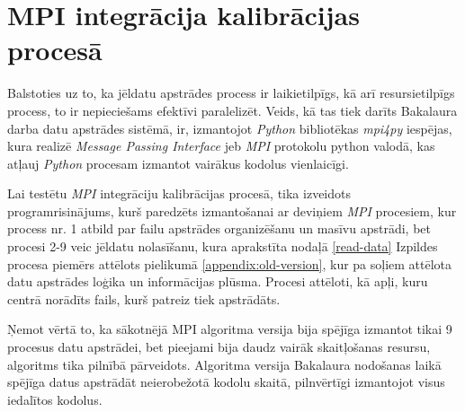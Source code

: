 \section{MPI integrācija kalibrācijas procesā}

Balstoties uz to, ka jēldatu apstrādes process ir laikietilpīgs, kā arī resursietilpīgs process, to ir nepieciešams efektīvi paralelizēt. Veids, kā tas tiek darīts Bakalaura darba datu apstrādes sistēmā, ir, izmantojot \textit{Python} bibliotēkas \textit{mpi4py} \cite{mpi-docs} iespējas, kura realizē \textit{Message Passing Interface} jeb \textit{MPI} protokolu python valodā, kas atļauj \textit{Python} procesam izmantot vairākus kodolus vienlaicīgi.

Lai testētu \textit{MPI} integrāciju kalibrācijas procesā, tika izveidots programrisinājums, kurš paredzēts izmantošanai ar deviņiem \textit{MPI} procesiem, kur process nr. 1  atbild par failu apstrādes organizēšanu un masīvu apstrādi, bet procesi 2-9 veic jēldatu nolasīšanu, kura aprakstīta nodaļā \ref{read-data} Izpildes procesa piemērs attēlots pielikumā \ref{appendix:old-version}, kur pa soļiem attēlota datu apstrādes loģika un informācijas plūsma. Procesi attēloti, kā apļi, kuru centrā norādīts fails, kurš patreiz tiek apstrādāts.


Ņemot vērtā to, ka sākotnējā MPI algoritma versija bija spējīga izmantot tikai 9 procesus datu apstrādei, bet pieejami bija daudz vairāk skaitļošanas resursu, algoritms tika pilnībā pārveidots. Algoritma versija Bakalaura nodošanas laikā spējīga datus apstrādāt neierobežotā kodolu skaitā, pilnvērtīgi izmantojot visus iedalītos kodolus.

